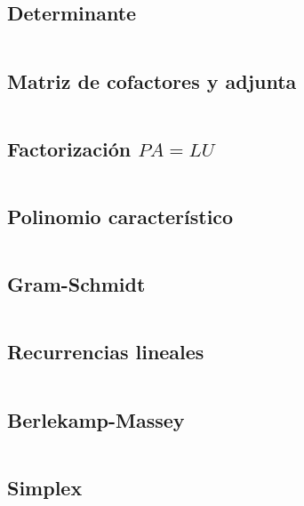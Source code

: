 \documentclass[11pt]{article}
\begin{document}
		\subsection{Determinante}
		\inputminted[tabsize=2,breaklines,firstline=227,lastline=240,fontsize=\small]{c++}{matrix.cpp}
		
		\subsection{Matriz de cofactores y adjunta}
		\inputminted[tabsize=2,breaklines,firstline=242,lastline=267,fontsize=\small]{c++}{matrix.cpp}
		
		\subsection{Factorización $PA=LU$}
		\inputminted[tabsize=2,breaklines,firstline=269,lastline=285,fontsize=\small]{c++}{matrix.cpp}
		
		\subsection{Polinomio característico}
		\inputminted[tabsize=2,breaklines,firstline=287,lastline=297,fontsize=\small]{c++}{matrix.cpp}
		
		\subsection{Gram-Schmidt}
		\inputminted[tabsize=2,breaklines,firstline=299,lastline=315,fontsize=\small]{c++}{matrix.cpp}
		
		\subsection{Recurrencias lineales}
		\inputminted[tabsize=2,breaklines,firstline=7,lastline=33,fontsize=\small]{c++}{recurrence.cpp}
		
		\subsection{Berlekamp-Massey}
		\inputminted[tabsize=2,breaklines,firstline=46,lastline=81,fontsize=\small]{c++}{recurrence.cpp}
		
		\subsection{Simplex}
		\inputminted[tabsize=2,breaklines,fontsize=\small]{c++}{simplex.cpp}
		
\end{document}

